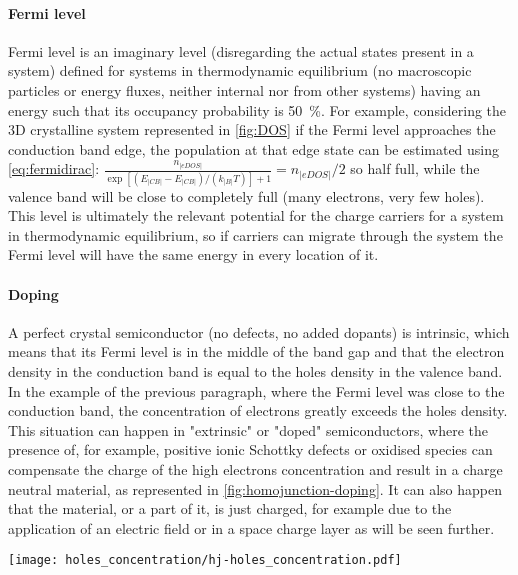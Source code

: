 		\paragraph{Fermi level}
		Fermi level is an imaginary level (disregarding the actual states present in a system) defined for systems in thermodynamic equilibrium (no macroscopic particles or energy fluxes, neither internal nor from other systems) having an energy such that its occupancy probability is \SI{50}{\%}.
		For example, considering the 3D crystalline system represented in \cref{fig:DOS} if the Fermi level approaches the conduction band edge, the population at that edge state can be estimated using \cref{eq:fermidirac}: $\frac{n_|eDOS|}{\exp[(E_|CB|-E_|CB|)/(k_|B|T)]+1} = n_|eDOS|/2$ so half full, while the valence band will be close to completely full (many electrons, very few holes).
		This level is ultimately the relevant potential for the charge carriers for a system in thermodynamic equilibrium, so if carriers can migrate through the system the Fermi level will have the same energy in every location of it.
		
		\paragraph{Doping}
		A perfect crystal semiconductor (no defects, no added dopants) is intrinsic, which means that its Fermi level is in the middle of the band gap and that the electron density in the conduction band is equal to the holes density in the valence band.
		In the example of the previous paragraph, where the Fermi level was close to the conduction band, the concentration of electrons greatly exceeds the holes density.
		This situation can happen in "extrinsic" or "doped" semiconductors, where the presence of, for example, positive ionic Schottky defects or oxidised species can compensate the charge of the high electrons concentration and result in a charge neutral material, as represented in \cref{fig:homojunction-doping}.
		It can also happen that the material, or a part of it, is just charged, for example due to the application of an electric field or in a space charge layer as will be seen further.
		
		\begin{SCfigure}
			\centering
			\texttt{[image: holes\_concentration/hj-holes\_concentration.pdf]}
			\label{fig:holes_concentration}
		\end{SCfigure}
	
